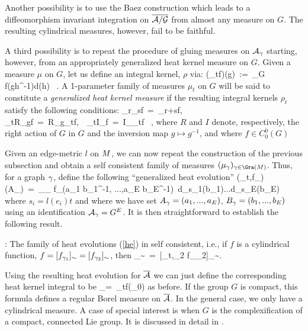 Another possibility is to use the Baez construction \cite{B1} which
leads to a diffeomorphism invariant integration on $\agb$ from almost any
measure on $G$. The resulting cylindrical measures, however, fail to
be faithful.

A third possibility is to repeat the procedure of gluing measures on
$\A_{\g}$ starting, however, from an appropriately generalized heat
kernel measure on $G$. Given a measure $\mu$ on $G$, let us define an
integral kernel, $\rho$ via:
\be
(\rho_t\star f)(g)\ :=\ \int_G f(gh^{-1})d\mu(h) \ . 
\ee
A 1-parameter family of measures $\mu_t$ on $G$ will be said to
constitute a {\it generalized heat kernel measure} if the resulting
integral kernels $\rho_t$ satisfy the following conditions:
\be
\rho_r\star \rho_s\star f\ =\ \rho_{r+s}\star f, \ \ 
\rho_t\star R_{g\star}f\ =\ R_{g\star}\rho_t\star f,\ \  
\rho_t\star I_{\star}f\ =\ I_{\star}\rho_t\star f \ ,
\ee
where $R$ and $I$ denote, respectively, the right action of $G$ in $G$
and the inversion map $g\mapsto g^{-1}$, and where $f\in C^0_0(G)$
%
%

Given an edge-metric $l$ on $\S$, we can now repeat the construction
of the previous subsection and obtain a self consistent family of
measures $(\mu_{\g})_{\g\in{\Gra(\S)}}$. Thus,
for a graph $\g$, define the following ``generalized heat
evolution''
\be \label{he}
(\rho_{t,\g}\star f_\g)(A_\g)\ =\ \int_{\A_\g} f_\g(a_1 b_1^{-1}, 
...,a_E b_E^{-1})\  d\mu_{s_1}(b_1)...d\mu_{s_E}(b_E)
\ee
where $s_i = l(e_i)t$ and where we have set $A_\g=(a_1,...,a_E)$,
$B_\g=(b_1,...,b_E)$ using an identification $\A_\g=G^E$. It is then
straightforward to establish the following result.
\begin{proposition}{\rm :} The family of heat evolutions (\ref{he})
in self consistent, i.e., if $f$ is a cylindrical function,
$f=[f_{\g_1}]_\sim= [f_{\g_2}]_\sim$, then
_\sim\ =\  [\rho_{t,\g_2}\star 
 f_{\g_2}]_\sim.
\ee
\end{proposition}

Using the resulting heat evolution for $\Ab$ we can just define
the corresponding heat kernel integral to be
\be
\int_\Ab  =\ \rho_t\star f(\A_0)
\ee
as before. If the group $G$ is compact, this formula defines a regular
Borel measure on $\Ab$. In the general case, we only have a
cylindrical measure. A case of special interest is when $G$ is the
complexification of a compact, connected Lie group. It is discussed
in detail in \cite{ALMMT3}.

